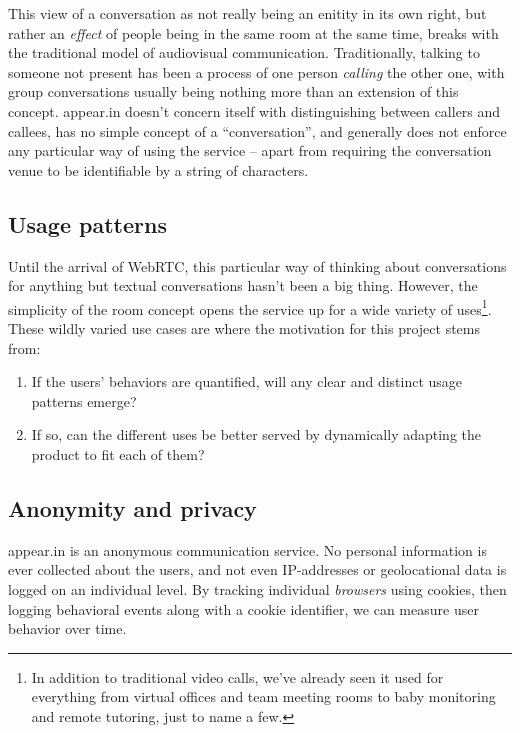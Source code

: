 This view of a conversation as not really being an enitity in its own right, but rather an \emph{effect} of people being in the same room at the same time, breaks with the traditional model of audiovisual communication. Traditionally, talking to someone not present has been a process of one person \emph{calling} the other one, with group conversations usually being nothing more than an extension of this concept. appear.in doesn't concern itself with distinguishing between callers and callees, has no simple concept of a ``conversation'', and generally does not enforce any particular way of using the service -- apart from requiring the conversation venue to be identifiable by a string of characters.

\subsection{Usage patterns}

Until the arrival of WebRTC, this particular way of thinking about conversations for anything but textual conversations hasn't been a big thing. However, the simplicity of the room concept opens the service up for a wide variety of uses\footnote{In addition to traditional video calls, we've already seen it used for everything from virtual offices and team meeting rooms to baby monitoring and remote tutoring, just to name a few.}. These wildly varied use cases are where the motivation for this project stems from:

\begin{enumerate}
  \item If the users' behaviors are quantified, will any clear and distinct usage patterns emerge?
  \item If so, can the different uses be better served by dynamically adapting the product to fit each of them?
\end{enumerate}

\subsection{Anonymity and privacy}
\label{sub:anonymity_privacy}

appear.in is an anonymous communication service. No personal information is ever collected about the users, and not even IP-addresses or geolocational data is logged on an individual level. By tracking individual \emph{browsers} using cookies, then logging behavioral events along with a cookie identifier, we can measure user behavior over time.

